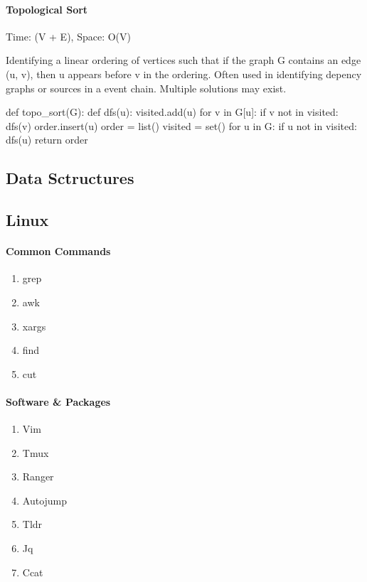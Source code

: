 \documentclass[11pt]{article}
\begin{document}
\paragraph{Topological Sort} Time: (V + E), Space: O(V)

  Identifying a linear ordering of vertices such that if the graph G contains
  an edge (u, v), then u appears before v in the ordering.  Often used in
  identifying depency graphs or sources in a event chain.  Multiple solutions
  may exist.

\begin{python}
def topo_sort(G):
    def dfs(u):
        visited.add(u)
        for v in G[u]:
            if v not in visited:
              dfs(v)
        order.insert(u)
    order = list()
    visited = set()
    for u in G:
        if u not in visited:
          dfs(u)
    return order
\end{python}


\subsection{Data Sctructures}

\subsection{Linux}

\paragraph{Common Commands}
\begin{enumerate}
  \item grep
  \item awk
  \item xargs
  \item find
  \item cut
\end{enumerate}

\paragraph{Software \& Packages}
\begin{enumerate}
  \item Vim
  \item Tmux
  \item Ranger
  \item Autojump
  \item Tldr
  \item Jq
  \item Ccat
\end{enumerate}
\end{document}
